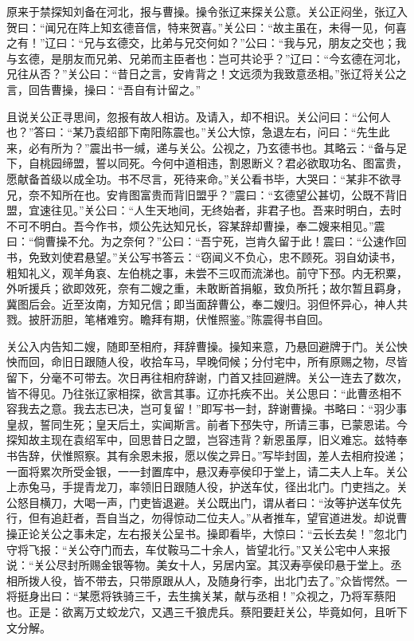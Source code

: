 原来于禁探知刘备在河北，报与曹操。操令张辽来探关公意。关公正闷坐，张辽入贺曰：“闻兄在阵上知玄德音信，特来贺喜。”关公曰：“故主虽在，未得一见，何喜之有！”辽曰：“兄与玄德交，比弟与兄交何如？”公曰：“我与兄，朋友之交也；我与玄德，是朋友而兄弟、兄弟而主臣者也：岂可共论乎？”辽曰：“今玄德在河北，兄往从否？”关公曰：“昔日之言，安肯背之！文远须为我致意丞相。”张辽将关公之言，回告曹操，操曰：“吾自有计留之。”

且说关公正寻思间，忽报有故人相访。及请入，却不相识。关公问曰：“公何人也？”答曰：“某乃袁绍部下南阳陈震也。”关公大惊，急退左右，问曰：“先生此来，必有所为？”震出书一缄，递与关公。公视之，乃玄德书也。其略云：“备与足下，自桃园缔盟，誓以同死。今何中道相违，割恩断义？君必欲取功名、图富贵，愿献备首级以成全功。书不尽言，死待来命。”关公看书毕，大哭曰：“某非不欲寻兄，奈不知所在也。安肯图富贵而背旧盟乎？”震曰：“玄德望公甚切，公既不背旧盟，宜速往见。”关公曰：“人生天地间，无终始者，非君子也。吾来时明白，去时不可不明白。吾今作书，烦公先达知兄长，容某辞却曹操，奉二嫂来相见。”震曰：“倘曹操不允。为之奈何？”公曰：“吾宁死，岂肯久留于此！震曰：“公速作回书，免致刘使君悬望。”关公写书答云：“窃闻义不负心，忠不顾死。羽自幼读书，粗知礼义，观羊角哀、左伯桃之事，未尝不三叹而流涕也。前守下邳。内无积粟，外听援兵；欲即效死，奈有二嫂之重，未敢断首捐躯，致负所托；故尔暂且羁身，冀图后会。近至汝南，方知兄信；即当面辞曹公，奉二嫂归。羽但怀异心，神人共戮。披肝沥胆，笔楮难穷。瞻拜有期，伏惟照鉴。”陈震得书自回。

关公入内告知二嫂，随即至相府，拜辞曹操。操知来意，乃悬回避牌于门。关公怏怏而回，命旧日跟随人役，收拾车马，早晚伺候；分付宅中，所有原赐之物，尽皆留下，分毫不可带去。次日再往相府辞谢，门首又挂回避牌。关公一连去了数次，皆不得见。乃往张辽家相探，欲言其事。辽亦托疾不出。关公思曰：“此曹丞相不容我去之意。我去志已决，岂可复留！”即写书一封，辞谢曹操。书略曰：“羽少事皇叔，誓同生死；皇天后土，实闻斯言。前者下邳失守，所请三事，已蒙恩诺。今探知故主现在袁绍军中，回思昔日之盟，岂容违背？新恩虽厚，旧义难忘。兹特奉书告辞，伏惟照察。其有余恩未报，愿以俟之异日。”写毕封固，差人去相府投递；一面将累次所受金银，一一封置库中，悬汉寿亭侯印于堂上，请二夫人上车。关公上赤兔马，手提青龙刀，率领旧日跟随人役，护送车仗，径出北门。门吏挡之。关公怒目横刀，大喝一声，门吏皆退避。关公既出门，谓从者曰：“汝等护送车仗先行，但有追赶者，吾自当之，勿得惊动二位夫人。”从者推车，望官道进发。却说曹操正论关公之事未定，左右报关公呈书。操即看毕，大惊曰：“云长去矣！”忽北门守将飞报：“关公夺门而去，车仗鞍马二十余人，皆望北行。”又关公宅中人来报说：“关公尽封所赐金银等物。美女十人，另居内室。其汉寿亭侯印悬于堂上。丞相所拨人役，皆不带去，只带原跟从人，及随身行李，出北门去了。”众皆愕然。一将挺身出曰：“某愿将铁骑三千，去生擒关某，献与丞相！”众视之，乃将军蔡阳也。正是：欲离万丈蛟龙穴，又遇三千狼虎兵。蔡阳要赶关公，毕竟如何，且听下文分解。